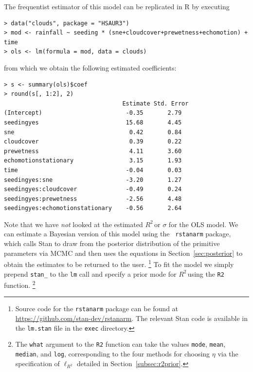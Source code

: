 \documentclass[11pt]{article}
\newcommand{\Rsq}{$R^2\,$}
\newcommand{\locRsq}{\ell_{R^2}}
\begin{document}
The frequentist estimator of this model can be replicated in R by executing

\vspace{.5cm}
\begin{lstlisting}[frame=lines]
> data("clouds", package = "HSAUR3")
> mod <- rainfall ~ seeding * (sne+cloudcover+prewetness+echomotion) + time
> ols <- lm(formula = mod, data = clouds)
\end{lstlisting}
\vspace{.5cm}

\noindent from which we obtain the following estimated coefficients:

\vspace{.5cm}
\begin{lstlisting}[frame=lines]
> s <- summary(ols)$coef
> round(s[, 1:2], 2)
                                  Estimate Std. Error
(Intercept)                        -0.35       2.79
seedingyes                         15.68       4.45
sne                                 0.42       0.84
cloudcover                          0.39       0.22
prewetness                          4.11       3.60
echomotionstationary                3.15       1.93
time                               -0.04       0.03
seedingyes:sne                     -3.20       1.27
seedingyes:cloudcover              -0.49       0.24
seedingyes:prewetness              -2.56       4.48
seedingyes:echomotionstationary    -0.56       2.64
\end{lstlisting}
\vspace{.5cm}

Note that we have \emph{not} looked at the estimated \Rsq or $\sigma$ for the
OLS model. We can estimate a Bayesian version of this model using the {\tt
rstanarm} package, which calls Stan \cite{stan} to draw from the posterior
distribution of the primitive parameters via MCMC and then uses the equations in
Section~\ref{sec:posterior} to obtain the estimates to be returned to the user.%
\footnote{Source code for the {\tt rstanarm} package can be found at
\url{https://github.com/stan-dev/rstanarm}. The relevant Stan code is
available in the {\tt lm.stan} file in the {\tt exec} directory.}
To fit the model we simply prepend {\tt stan\_} to the {\tt lm} call and specify
a prior mode for \Rsq using the {\tt R2} function.%
\footnote{The {\tt what} argument to the {\tt R2} function can take the values
{\tt mode}, {\tt mean}, {\tt median}, and {\tt log}, corresponding to the four
methods for choosing $\eta$ via the specification of $\locRsq$ detailed in
Section~\ref{subsec:r2prior}.}
\end{document}
